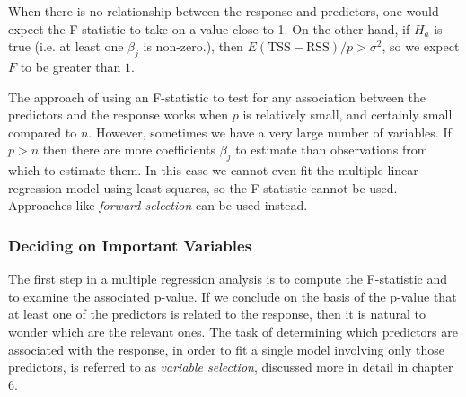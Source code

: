 \documentclass{article}
\numberwithin{equation}{section}
\begin{document}
When there is no relationship between the response and predictors, one would expect the F-statistic to take on a value close to 1. On the other hand, if $H_a$ is true (i.e. at least one $\beta_j$ is non-zero.), then $E{(\text{TSS} - \text{RSS})/p} > \sigma^2$, so we expect $F$ to be greater than $1$.

The approach of using an F-statistic to test for any association between the predictors and the response works when $p$ is relatively small, and certainly small compared to $n$. However, sometimes we have a very large number of variables. If $p>n$ then there are more coefficients $\beta_j$ to estimate than observations from which to estimate them. In this case we cannot even fit the multiple linear regression model using least squares, so the F-statistic cannot be used. Approaches like \textit{forward selection} can be used instead.

\subsubsection{Deciding on Important Variables}
The first step in a multiple regression analysis is to compute the F-statistic and to examine the associated p-value. If we conclude on the basis of the p-value that at least one of the predictors is related to the response, then it is natural to wonder which are the relevant ones. The task of determining which predictors are associated with the response, in order to fit a single model involving only those predictors, is referred to as \textit{variable selection}, discussed more in detail in chapter 6.
\end{document}

